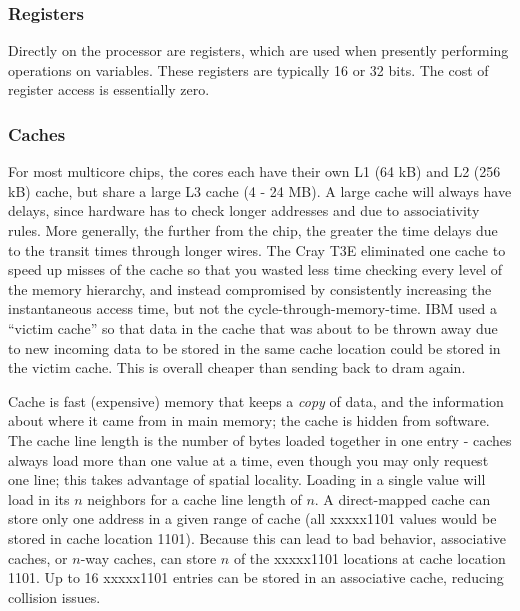 \documentclass[10pt]{article}
\begin{document}
\begin{flushleft}
\subsubsection{Registers}
Directly on the processor are registers, which are used when presently performing operations on variables. These registers are typically 16 or 32 bits. The cost of register access is essentially zero. 

\subsubsection{Caches}
For most multicore chips, the cores each have their own L1 (64 kB) and L2 (256 kB) cache, but share a large L3 cache (4 - 24 MB). A large cache will always have delays, since hardware has to check longer addresses and due to associativity rules. More generally, the further from the chip, the greater the time delays due to the transit times through longer wires. The Cray T3E eliminated one cache to speed up misses of the cache so that you wasted less time checking every level of the memory hierarchy, and instead compromised by consistently increasing the instantaneous access time, but not the cycle-through-memory-time. IBM used a ``victim cache'' so that data in the cache that was about to be thrown away due to new incoming data to be stored in the same cache location could be stored in the victim cache. This is overall cheaper than sending back to \gls{dram} again.

Cache is fast (expensive) memory that keeps a \textit{copy} of data, and the information about where it came from in main memory; the cache is hidden from software. The cache line length is the number of bytes loaded together in one entry - caches always load more than one value at a time, even though you may only request one line; this takes advantage of spatial locality. Loading in a single value will load in its \(n\) neighbors for a cache line length of \(n\). A direct-mapped cache can store only one address in a given range of cache (all xxxxx1101 values would be stored in cache location 1101). Because this can lead to bad behavior, associative caches, or \(n\)-way caches, can store \(n\) of the xxxxx1101 locations at cache location 1101. Up to 16 xxxxx1101 entries can be stored in an associative cache, reducing collision issues.


\end{flushleft}
\end{document}
